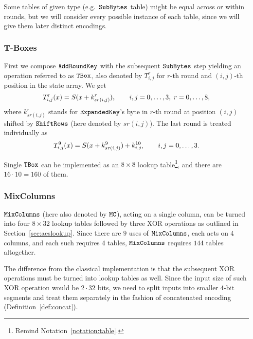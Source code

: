 \begin{note}
\label{note:tableinst}
	Some tables of given type (e.g.\ $\texttt{SubBytes}$ table) might be equal across or within rounds, but we will consider every possible instance of each table, since we will give them later distinct encodings.
\end{note}

\subsubsection{T-Boxes}
	
	First we compose $\texttt{AddRoundKey}$ with the subsequent $\texttt{SubBytes}$ step yielding an operation referred to as $\texttt{TBox}$, also denoted by $T_{i,j}^r$ for $r$-th round and $(i,j)$-th position in the state array. We get
	\begin{equation*}
		T_{i,j}^r(x) = S(x+k_{sr(i,j)}^r) , \qquad i,j=0 , \ldots , 3,\;r=0 , \ldots , 8 ,
	\end{equation*}
	where $k_{sr(i,j)}^r$ stands for $\texttt{ExpandedKey}$'s byte in $r$-th round at position $(i,j)$ shifted by $\texttt{ShiftRows}$ (here denoted by $sr(i,j)$). The last round is treated individually as
	\begin{equation}
	\label{eq:lasttbox}
		T_{i,j}^{9}(x) = S(x+k_{sr(i,j)}^9) + k_{i,j}^{10} , \qquad i,j=0 , \ldots , 3 .
	\end{equation}
	
	Single $\texttt{TBox}$ can be implemented as an $8\times 8$ lookup table\footnote{Remind Notation~\ref{notation:table}.}, and there are $16\cdot 10 = 160$ of them.

\subsubsection{MixColumns}
	
	$\texttt{MixColumns}$ (here also denoted by $\texttt{MC}$), acting on a single column, can be turned into four $8\times 32$ lookup tables followed by three XOR operations as outlined in Section~\ref{sec:aeslookup}. Since there are $9$ uses of $\texttt{MixColumns}$, each acts on $4$ columns, and each such requires $4$ tables, $\texttt{MixColumns}$ requires $144$ tables altogether.
	
	The difference from the classical implementation is that the subsequent XOR operations must be turned into lookup tables as well. Since the input size of such XOR operation would be $2\cdot 32$ bits, we need to split inputs into smaller $4$-bit segments and treat them separately in the fashion of concatenated encoding (Definition~\ref{def:concat}).
	
